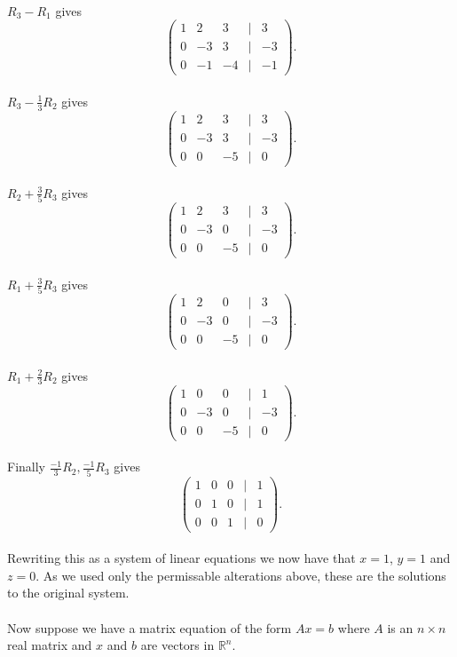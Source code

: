 \documentclass{amsart}
\begin{document}
\\
$R_3-R_1$ gives
\begin{equation*}
 \begin{pmatrix}
 1&2&3&|&3\\
 0&-3&3&|&-3\\
 0&-1&-4&|&-1
 \end{pmatrix}.
\end{equation*}
\\
$R_3-\frac{1}{3}R_2$ gives
\begin{equation*}
 \begin{pmatrix}
 1&2&3&|&3\\
 0&-3&3&|&-3\\
 0&0&-5&|&0
 \end{pmatrix}.
\end{equation*}
\\
$R_2+\frac{3}{5}R_3$ gives
\begin{equation*}
 \begin{pmatrix}
 1&2&3&|&3\\
 0&-3&0&|&-3\\
 0&0&-5&|&0
 \end{pmatrix}.
\end{equation*}
\\
$R_1+\frac{3}{5}R_3$ gives
\begin{equation*}
 \begin{pmatrix}
 1&2&0&|&3\\
 0&-3&0&|&-3\\
 0&0&-5&|&0
 \end{pmatrix}.
\end{equation*}
\\
$R_1+\frac{2}{3}R_2$ gives
\begin{equation*}
 \begin{pmatrix}
 1&0&0&|&1\\
 0&-3&0&|&-3\\
 0&0&-5&|&0
 \end{pmatrix}.
\end{equation*}
\\
Finally $\frac{-1}{3}R_2,\frac{-1}{5}R_3$ gives
\begin{equation*}
 \begin{pmatrix}
 1&0&0&|&1\\
 0&1&0&|&1\\
 0&0&1&|&0
 \end{pmatrix}.
\end{equation*}
\\
Rewriting this as a system of linear equations we now have that $x=1$, $y=1$ and $z=0$. As we used only the permissable alterations above, these are the solutions to the original system.\\
\\
Now suppose we have a matrix equation of the form $Ax=b$ where $A$ is an $n\times n$ real matrix and $x$ and $b$ are vectors in $\mathbb{R}^{n}$.
\end{document}
